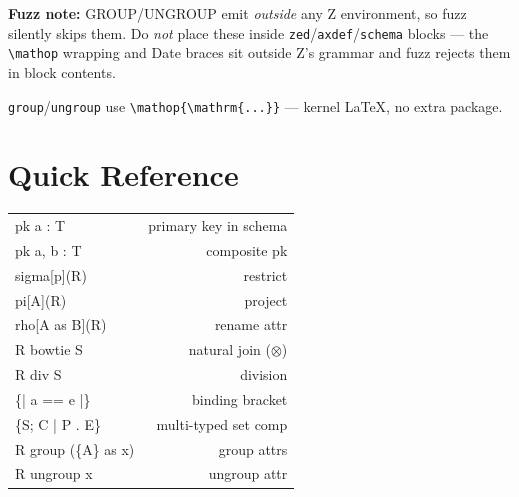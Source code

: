 \documentclass[10pt,landscape,a4paper]{article}
\begin{document}
\begin{multicols}{3}
{\scriptsize\textbf{Fuzz note:} GROUP/UNGROUP emit \emph{outside} any Z environment, so fuzz silently skips them. Do \emph{not} place these inside \texttt{zed}/\texttt{axdef}/\texttt{schema} blocks — the \texttt{\textbackslash mathop} wrapping and Date braces sit outside Z's grammar and fuzz rejects them in block contents.}

{\scriptsize \texttt{group}/\texttt{ungroup} use \texttt{\textbackslash mathop\{\textbackslash mathrm\{...\}\}} — kernel LaTeX, no extra package.}

\section{Quick Reference}

\begin{tabularx}{\columnwidth}{LR}
pk a : T             & primary key in schema \\
pk a, b : T          & composite pk \\
sigma[p](R)          & restrict \\
pi[A](R)             & project \\
rho[A as B](R)       & rename attr \\
R bowtie S           & natural join ($\otimes$) \\
R div S              & division \\
\{| a == e |\}       & binding bracket \\
\{S; C | P . E\}    & multi-typed set comp \\
R group (\{A\} as x) & group attrs \\
R ungroup x          & ungroup attr \\
\end{tabularx}

\end{multicols}
\end{document}
